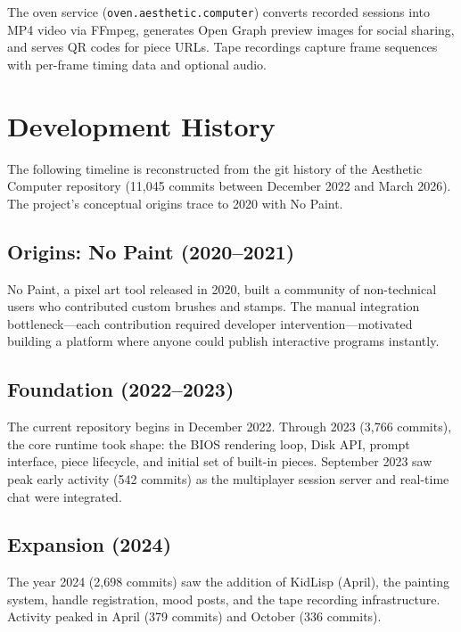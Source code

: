 \documentclass[10pt,letterpaper,twocolumn]{article}
\begin{document}
The oven service (\texttt{oven.aesthetic.computer}) converts recorded sessions into MP4 video via FFmpeg, generates Open Graph preview images for social sharing, and serves QR codes for piece URLs. Tape recordings capture frame sequences with per-frame timing data and optional audio.


\section{Development History}
\label{sec:history}

The following timeline is reconstructed from the git history of the Aesthetic Computer repository (11,045 commits between December 2022 and March 2026). The project's conceptual origins trace to 2020 with No Paint.

\subsection{Origins: No Paint (2020--2021)}

No Paint, a pixel art tool released in 2020, built a community of non-technical users who contributed custom brushes and stamps. The manual integration bottleneck---each contribution required developer intervention---motivated building a platform where anyone could publish interactive programs instantly.

\subsection{Foundation (2022--2023)}

The current repository begins in December 2022. Through 2023 (3,766 commits), the core runtime took shape: the BIOS rendering loop, Disk API, prompt interface, piece lifecycle, and initial set of built-in pieces. September 2023 saw peak early activity (542 commits) as the multiplayer session server and real-time chat were integrated.

\subsection{Expansion (2024)}

The year 2024 (2,698 commits) saw the addition of KidLisp (April), the painting system, handle registration, mood posts, and the tape recording infrastructure. Activity peaked in April (379 commits) and October (336 commits).
\end{document}
